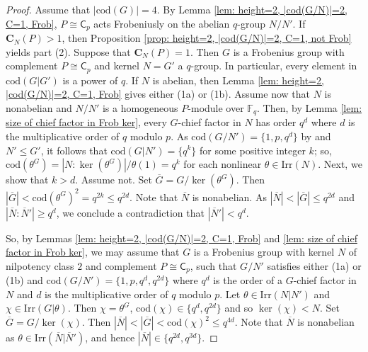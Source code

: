 \documentclass[9pt]{article}
\begin{document}
\begin{proof}
	Assume that $|\mathrm{cod}(G)|=4$.
	By Lemma \ref{lem: height=2, |cod(G/N)|=2, C=1, Frob},
	$P\cong \mathsf{C}_{p}$ acts Frobeniusly on the abelian $q$-group
    $N/N'$.
	If $\mathbf{C}_{N}(P)>1$,
	then Proposition \ref{prop: height=2, |cod(G/N)|=2, C=1, not Frob} yields part (2).
    Suppose that $\mathbf{C}_{N}(P)=1$.
	Then $G$ is a Frobenius group with complement $P\cong \mathsf{C}_{p}$ and kernel $N=G'$ a $q$-group.
	In particular, every element in $\mathrm{cod}(G|G')$ is a power of $q$.
    If $N$ is abelian,
	then Lemma \ref{lem: height=2, |cod(G/N)|=2, C=1, Frob} gives either (1a) or (1b).
	Assume now that $N$ is nonabelian and $N/N'$ is a homogeneous $P$-module over $\mathbb{F}_q$.
	Then, by Lemma \ref{lem: size of chief factor in Frob ker}, every $G$-chief factor in $N$ has order $q^{d}$ where $d$ is the multiplicative order of $q$ modulo $p$.
	As $\mathrm{cod}(G/N')=\{ 1,p,q^{d} \}$ by \cite[Corollary B]{qian2023} and $N'\leq G'$, 
	it follows that $\mathrm{cod}(G|N')=\{ q^{k} \}$ for some positive integer $k$;
	so, $\mathrm{cod}(\theta^{G})=|N:\ker(\theta^G)|/\theta(1)=q^{k}$ for each nonlinear $\theta\in \mathrm{Irr}(N)$.
	Next, we show that $k>d$.
    Assume not. 
	Set $\overline{G}=G/\ker(\theta^{G})$.
	Then $|\overline{G}|<\mathrm{cod}(\theta^{G})^{2}=q^{2k}\leq q^{2d}$.
	Note that $\overline{N}$ is nonabelian.
    As $|\overline{N}|<|\overline{G}|\leq q^{2d}$ and $|\overline{N}:\overline{N}'|\geq q^{d}$,
    we conclude a contradiction that 
	$|\overline{N}'|<q^{d}$.


	So, by Lemmas \ref{lem: height=2, |cod(G/N)|=2, C=1, Frob} and \ref{lem: size of chief factor in Frob ker},
    we may assume that $G$ is a Frobenius group with kernel $N$ of nilpotency class $2$ and complement $P\cong \mathsf{C}_{p}$,
	such that
	$G/N'$ satisfies either (1a) or (1b) and $\mathrm{cod}(G/N')=\{ 1,p,q^{d},q^{2d} \}$ where $q^{d}$ is the order of 
	a $G$-chief factor in $N$ and $d$ is the multiplicative order of $q$ modulo 
	$p$.
	Let $\theta\in \mathrm{Irr}(N|N')$ and $\chi\in \mathrm{Irr}(G|\theta)$.
	Then $\chi=\theta^{G}$, $\mathrm{cod}(\chi)\in \{ q^{d},q^{2d} \}$ and so $\ker(\chi)< N$.
	Set $\overline{G}=G/\ker(\chi)$.
	Then $|\overline{N}|<|\overline{G}|<\mathrm{cod}(\chi)^{2}\leq q^{4d}$.
	Note that $\overline{N}$ is nonabelian as $\theta\in \mathrm{Irr}(\overline{N}|\overline{N}')$,
	and hence $|\overline{N}|\in \{ q^{2d},q^{3d} \}$.
   


\end{proof}
\end{document}
